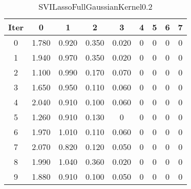 \begin{table}
	\begin{center}
		\begin{tabular}{|c|c|c|c|c|c|c|c|c|}
			\hline
			Iter & 0 & 1 & 2 & 3 & 4 & 5 & 6 & 7 \\
			\hline
			0 & 1.780 & 0.920 & 0.350 & 0.020 & 0 & 0 & 0 & 0 \\
			\hline
			1 & 1.940 & 0.970 & 0.350 & 0.020 & 0 & 0 & 0 & 0 \\
			\hline
			2 & 1.100 & 0.990 & 0.170 & 0.070 & 0 & 0 & 0 & 0 \\
			\hline
			3 & 1.650 & 0.950 & 0.110 & 0.060 & 0 & 0 & 0 & 0 \\
			\hline
			4 & 2.040 & 0.910 & 0.100 & 0.060 & 0 & 0 & 0 & 0 \\
			\hline
			5 & 1.260 & 0.910 & 0.130 & 0 & 0 & 0 & 0 & 0 \\
			\hline
			6 & 1.970 & 1.010 & 0.110 & 0.060 & 0 & 0 & 0 & 0 \\
			\hline
			7 & 2.070 & 0.820 & 0.120 & 0.050 & 0 & 0 & 0 & 0 \\
			\hline
			8 & 1.990 & 1.040 & 0.360 & 0.020 & 0 & 0 & 0 & 0 \\
			\hline
			9 & 1.880 & 0.910 & 0.100 & 0.050 & 0 & 0 & 0 & 0 \\
			\hline
		\end{tabular}
	\end{center}
	\caption{SVILassoFullGaussianKernel0.2}
\end{table}